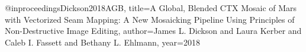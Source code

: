 @inproceedings{Dickson2018AGB,
  title={A Global, Blended CTX Mosaic of Mars with Vectorized Seam Mapping: A New Mosaicking Pipeline Using Principles of Non-Destructive Image Editing},
  author={James L. Dickson and Laura Kerber and Caleb I. Fassett and Bethany L. Ehlmann},
  year={2018}
}